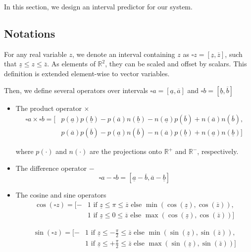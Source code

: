 \documentclass{article}
\newcommand{\interval}[1]{\square #1}
\newcommand{\imin}[1]{\underline{#1}}
\newcommand{\imax}[1]{\overline{#1}}
\begin{document}
In this section, we design an interval predictor for our system.

\subsection{Notations}


For any real variable $z$, we denote an interval containing $z$ as $\interval{z} = [\imin{z}, \imax{z}]$, such that $\imin{z} \leq z \leq \imax{z}$. As elements of $\mathbb{R}^2$, they can be scaled and offset by scalars. This definition is extended element-wise to vector variables.

Then, we define several operators over intervals $\interval{a} = [\imin{a}, \imax{a}]$ and $\interval{b} = [\imin{b}, \imax{b}]$

\begin{itemize}
\item The product operator $\times$ 
\begin{align}
\interval{a} \times \interval{b} = [&p(\imin{a})p(\imin{b})-p(\imax{a})n(\imin{b})-n(\imin{a})p(\imax{b})+n(\imax{a})n(\imax{b}), \\
&p(\imax{a})p(\imax{b})-p(\imin{a})n(\imax{b})-n(\imax{a})p(\imin{b})+n(\imin{a})n(\imin{b})]
\end{align}

where $p(\cdot)$ and $n(\cdot)$ are the projections onto $\mathbb{R}^+$ and $\mathbb{R}^-$, respectively.

\item The difference operator $-$
\begin{equation}
\interval{a} - \interval{b} = [\imin{a} - \imax{b}, \imax{a} - \imin{b}]
\end{equation}

\item The cosine and sine operators
\begin{align}
\cos(\interval{z}) = [-&1 \text{ if } \imin{z} \leq \pi \leq \imax{z} \text{ else } \min(\cos(\imin{z}), \cos(\imax{z})),\\
&1 \text{ if } \imin{z} \leq 0 \leq \imax{z} \text{ else } \max(\cos(\imin{z}), \cos(\imax{z}))]
\end{align}

\begin{align}
\sin(\interval{z}) = [-&1 \text{ if } \imin{z} \leq -\frac{\pi}{2} \leq \imax{z} \text{ else } \min(\sin(\imin{z}), \sin(\imax{z})),\\
&1 \text{ if } \imin{z} \leq +\frac{\pi}{2} \leq \imax{z} \text{ else } \max(\sin(\imin{z}), \sin(\imax{z}))]
\end{align}


\end{itemize}
\end{document}
